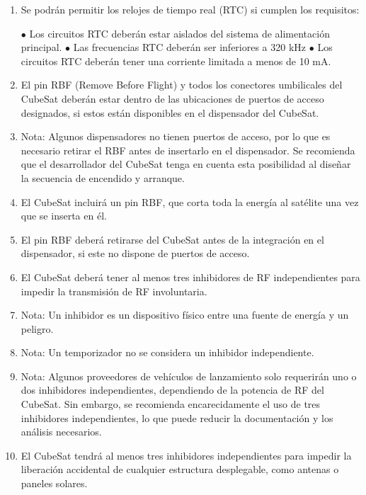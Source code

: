 \documentclass[12pt]{article}
\begin{document}
\begin{enumerate}
		\item Se podrán permitir los relojes de tiempo real (RTC) si cumplen los requisitos:
		
		\subitem $\bullet$ Los circuitos RTC deberán estar aislados del sistema de alimentación principal.
		\subitem $\bullet$ Las frecuencias RTC deberán ser inferiores a 320 kHz
		\subitem $\bullet$ Los circuitos RTC deberán tener una corriente limitada a menos de 10 mA.
		
		\item El pin RBF (Remove Before Flight) y todos los conectores umbilicales del CubeSat deberán estar dentro de las ubicaciones de puertos de acceso designados, si estos están disponibles en el dispensador del CubeSat.
		
		\item Nota: Algunos dispensadores no tienen puertos de acceso, por lo que es necesario retirar el RBF antes de insertarlo en el dispensador. Se recomienda que el desarrollador del CubeSat tenga en cuenta esta posibilidad al diseñar la secuencia de encendido y arranque.
		
		\item El CubeSat incluirá un pin RBF, que corta toda la energía al satélite una vez que se inserta en él.
		
		\item El pin RBF deberá retirarse del CubeSat antes de la integración en el dispensador, si este no dispone de puertos de acceso.
		
		\item El CubeSat deberá tener al menos tres inhibidores de RF independientes para impedir la transmisión de RF involuntaria.
		
		\item Nota: Un inhibidor es un dispositivo físico entre una fuente de energía y un peligro.
		
		\item Nota: Un temporizador no se considera un inhibidor independiente.
		
		\item Nota: Algunos proveedores de vehículos de lanzamiento solo requerirán uno o dos inhibidores independientes, dependiendo de la potencia de RF del CubeSat. Sin embargo, se recomienda encarecidamente el uso de tres inhibidores independientes, lo que puede reducir la documentación y los análisis necesarios.
		
		\item El CubeSat tendrá al menos tres inhibidores independientes para impedir la liberación accidental de cualquier estructura desplegable, como antenas o paneles solares.
	\end{enumerate}
	
\end{document}
